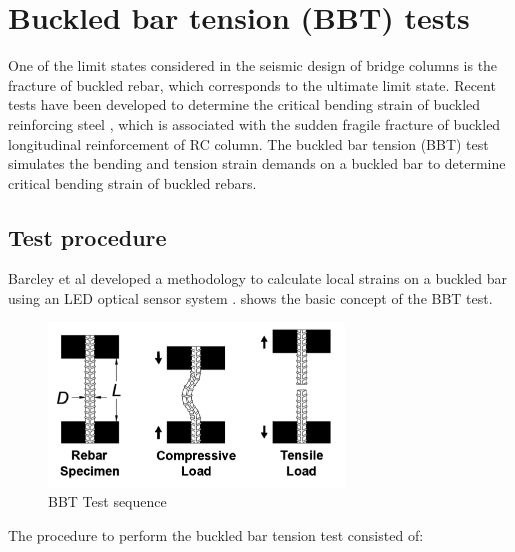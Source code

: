 \section{Buckled bar tension (BBT) tests}

One of the limit states considered in the seismic design of bridge columns is the fracture of buckled rebar, which corresponds to the ultimate limit state. Recent tests have been developed to determine the critical bending strain of buckled reinforcing steel  \cite{Barcley2019}, which is associated with the sudden fragile fracture of buckled longitudinal reinforcement of RC column. The buckled bar tension (BBT) test simulates the bending and tension strain demands on a buckled bar to determine critical bending strain of buckled rebars. 

\subsection{Test procedure}
Barcley et al \cite{Barcley2019} developed a methodology to calculate local strains on a buckled bar using an LED optical sensor system \cite{NorthernDigitalInc.2020}.  shows the basic concept of the BBT test.

\begin{figure}[htbp]
	\centering
	\includegraphics[width=0.7\textwidth]{Chapter-3/figs/BBT_Sequence}
	\caption{BBT Test sequence\cite{Barcley2019}}
	\label{fig:BBTseq}
\end{figure}

The procedure to perform the buckled bar tension test consisted of:

